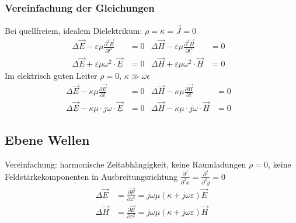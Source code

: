\subsubsection{Vereinfachung der Gleichungen}
Bei quellfreiem, idealem Dielektrikum: $ \rho = \kappa = \vec{J} = 0$
\begin{align*}
	\Delta \vec{E}-\varepsilon \mu \frac{\partial^{2} \vec{E}}{\partial t^{2}} & =0 & 
	\Delta \vec{H}-\varepsilon \mu \frac{\partial^{2} \vec{H}}{\partial t^{2}} & =0 &\\
	\Delta \underline{\vec{E}}+\varepsilon \mu \omega^{2} \cdot \underline{\vec{E}} & =0 &
	\Delta \underline{\vec{H}}+\varepsilon \mu \omega^{2} \cdot \underline{\vec{H}} & =0 &
\end{align*}
Im elektrisch guten Leiter $\rho = 0,\, \kappa \gg \omega \epsilon$
\begin{align*}
	\Delta \vec{E}-\kappa \mu \frac{\partial \vec{E}}{\partial t} & =0 & 
	\Delta \vec{H}-\kappa \mu \frac{\partial \vec{H}}{\partial t} & =0 &\\
	\Delta \underline{\vec{E}}-\kappa \mu \cdot j \omega \cdot \underline{\vec{E}} & =0 &
	\Delta \underline{\vec{H}}-\kappa \mu \cdot j \omega \cdot \underline{\vec{H}} & =0 &
\end{align*}


\subsection{Ebene Wellen}
Vereinfachung: harmonische Zeitabhängigkeit, keine Raumladungen $ \rho = 0 $, keine Feldstärkekomponenten in Ausbreitungsrichtung $ \frac{\partial^2 }{\partial^2 x} = \frac{\partial^2 }{\partial^2 y} = 0 $
\begin{align*}
	\Delta \vec{E} & = \frac{ \partial \vec{E}}{ \partial z^2} = j \omega \mu ( \kappa + j \omega \varepsilon) \vec{E} \\
	\Delta \vec{H} & = \frac{ \partial \vec{E}}{ \partial z^2} = j \omega \mu ( \kappa + j \omega \varepsilon) \vec{H}
\end{align*}

